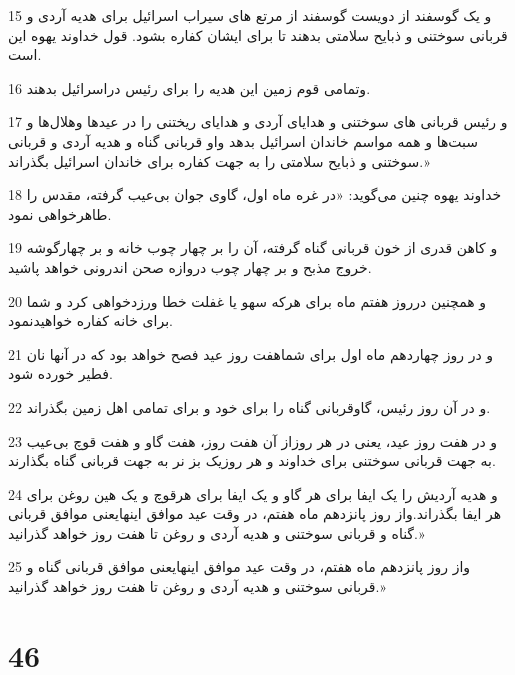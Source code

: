 \par 15 و یک گوسفند از دویست گوسفند از مرتع های سیراب اسرائیل برای هدیه آردی و قربانی سوختنی و ذبایح سلامتی بدهند تا برای ایشان کفاره بشود. قول خداوند یهوه این است.
\par 16 وتمامی قوم زمین این هدیه را برای رئیس دراسرائیل بدهند.
\par 17 و رئیس قربانی های سوختنی و هدایای آردی و هدایای ریختنی را در عیدها وهلال‌ها و سبت‌ها و همه مواسم خاندان اسرائیل بدهد واو قربانی گناه و هدیه آردی و قربانی سوختنی و ذبایح سلامتی را به جهت کفاره برای خاندان اسرائیل بگذراند.»
\par 18 خداوند یهوه چنین می‌گوید: «در غره ماه اول، گاوی جوان بی‌عیب گرفته، مقدس را طاهرخواهی نمود.
\par 19 و کاهن قدری از خون قربانی گناه گرفته، آن را بر چهار چوب خانه و بر چهارگوشه خروج مذبح و بر چهار چوب دروازه صحن اندرونی خواهد پاشید.
\par 20 و همچنین درروز هفتم ماه برای هر‌که سهو یا غفلت خطا ورزدخواهی کرد و شما برای خانه کفاره خواهیدنمود.
\par 21 و در روز چهاردهم ماه اول برای شماهفت روز عید فصح خواهد بود که در آنها نان فطیر خورده شود.
\par 22 و در آن روز رئیس، گاوقربانی گناه را برای خود و برای تمامی اهل زمین بگذراند.
\par 23 و در هفت روز عید، یعنی در هر روزاز آن هفت روز، هفت گاو و هفت قوچ بی‌عیب به جهت قربانی سوختنی برای خداوند و هر روزیک بز نر به جهت قربانی گناه بگذارند.
\par 24 و هدیه آردیش را یک ایفا برای هر گاو و یک ایفا برای هرقوچ و یک هین روغن برای هر ایفا بگذراند.واز روز پانزدهم ماه هفتم، در وقت عید موافق اینهایعنی موافق قربانی گناه و قربانی سوختنی و هدیه آردی و روغن تا هفت روز خواهد گذرانید.»
\par 25 واز روز پانزدهم ماه هفتم، در وقت عید موافق اینهایعنی موافق قربانی گناه و قربانی سوختنی و هدیه آردی و روغن تا هفت روز خواهد گذرانید.»

\chapter{46}

